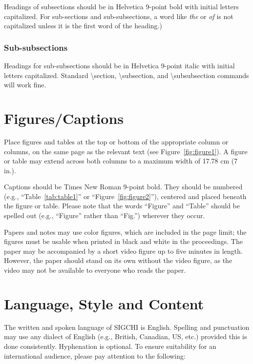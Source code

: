 \documentclass{sigchi}
\begin{document}
Headings of subsections should be in Helvetica 9-point bold with
initial letters capitalized.  For
sub-sections and sub-subsections, a word like \emph{the} or \emph{of}
is not capitalized unless it is the first word of the heading.)

\subsubsection{Sub-subsections}

Headings for sub-subsections should be in Helvetica 9-point italic
with initial letters capitalized.  Standard {\textbackslash}section,
{\textbackslash}subsection, and {\textbackslash}subsubsection commands
will work fine.

\section{Figures/Captions}

Place figures and tables at the top or bottom of the appropriate
column or columns, on the same page as the relevant text
(see Figure~\ref{fig:figure1}). A figure or table may extend across both
columns to a maximum width of 17.78 cm (7 in.).

Captions should be Times New Roman 9-point bold.  They should be numbered (e.g.,
``Table~\ref{tab:table1}'' or ``Figure~\ref{fig:figure2}''), centered
and placed beneath the figure or table.  Please note that the words
``Figure'' and ``Table'' should be spelled out (e.g., ``Figure''
rather than ``Fig.'') wherever they occur.

Papers and notes may use color figures, which are included in the page
limit; the figures must be usable when printed in black and white in
the proceedings.  The paper may be accompanied by a short video figure
up to five minutes in length.  However, the paper should stand on its
own without the video figure, as the video may not be available to
everyone who reads the paper.

\section{Language, Style and Content}

The written and spoken language of SIGCHI is English. Spelling and
punctuation may use any dialect of English (e.g., British, Canadian,
US, etc.) provided this is done consistently. Hyphenation is
optional. To ensure suitability for an international audience, please
pay attention to the following:
\end{document}

